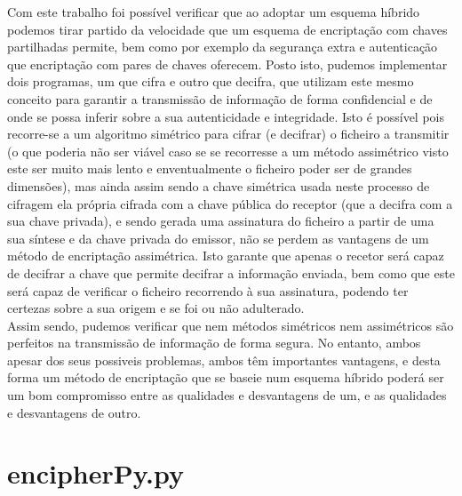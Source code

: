 \documentclass[a4paper,11pt,openright,oneside]{report}
\begin{document}
Com este trabalho foi possível verificar que ao adoptar um esquema híbrido podemos tirar partido da velocidade que um esquema de encriptação com chaves partilhadas permite, bem como por exemplo da segurança extra e autenticação que encriptação com pares de chaves oferecem. Posto isto, pudemos implementar dois programas, um que cifra e outro que decifra, que utilizam este mesmo conceito para garantir a transmissão de informação de forma confidencial e de onde se possa inferir sobre a sua autenticidade e integridade. Isto é possível pois recorre-se a um algoritmo simétrico para cifrar (e decifrar) o ficheiro a transmitir (o que poderia não ser viável caso se se recorresse a um método assimétrico visto este ser muito mais lento e enventualmente o ficheiro poder ser de grandes dimensões), mas ainda assim sendo a chave simétrica usada neste processo de cifragem ela própria cifrada com a chave pública do receptor (que a decifra com a sua chave privada), e sendo gerada uma assinatura do ficheiro a partir de uma sua síntese e da chave privada do emissor, não se perdem as vantagens de um método de encriptação assimétrica. Isto garante que apenas o recetor será capaz de decifrar a chave que permite decifrar a informação enviada, bem como que este será capaz de verificar o ficheiro recorrendo à sua assinatura, podendo ter certezas sobre a sua origem e se foi ou não adulterado.\\
Assim sendo, pudemos verificar que nem métodos simétricos nem assimétricos são perfeitos na transmissão de informação de forma segura. No entanto, ambos apesar dos seus possiveis problemas, ambos têm importantes vantagens, e desta forma um método de encriptação que se baseie num esquema híbrido poderá ser um bom compromisso entre as qualidades e desvantagens de um, e as qualidades e desvantagens de outro. 

\appendix
\newpage
\section{encipherPy.py}
\label{App:encipher.py}
\end{document}
